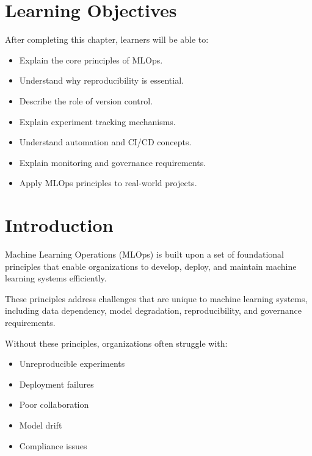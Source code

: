
\label{chap:mlops-principles}

\section{Learning Objectives}

After completing this chapter, learners will be able to:

\begin{itemize}
    \item Explain the core principles of MLOps.
    \item Understand why reproducibility is essential.
    \item Describe the role of version control.
    \item Explain experiment tracking mechanisms.
    \item Understand automation and CI/CD concepts.
    \item Explain monitoring and governance requirements.
    \item Apply MLOps principles to real-world projects.
\end{itemize}

\section{Introduction}

Machine Learning Operations (MLOps) is built upon a set of foundational principles that enable organizations to develop, deploy, and maintain machine learning systems efficiently.

These principles address challenges that are unique to machine learning systems, including data dependency, model degradation, reproducibility, and governance requirements.

Without these principles, organizations often struggle with:

\begin{itemize}
    \item Unreproducible experiments
    \item Deployment failures
    \item Poor collaboration
    \item Model drift
    \item Compliance issues
\end{itemize}

